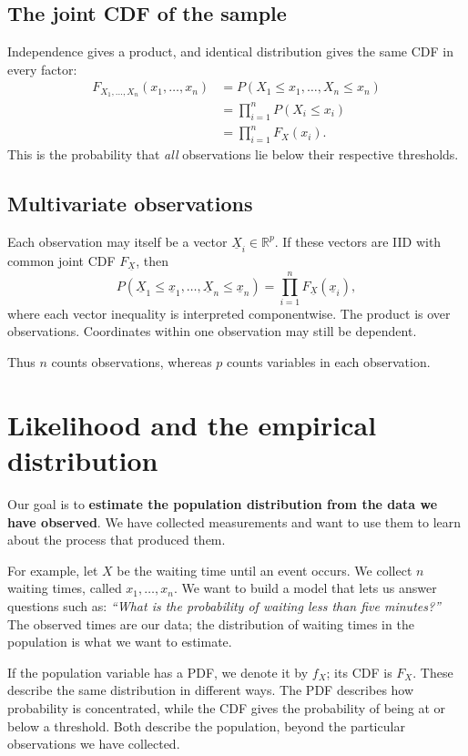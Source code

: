 \documentclass[a4paper,12pt,oneside]{report}
\begin{document}
\subsection{The joint CDF of the sample}
Independence gives a product, and identical distribution gives
the same CDF in every factor:
\begin{align*}
  F_{X_1,\ldots,X_n}(x_1,\ldots,x_n)
    &=P(X_1\leq x_1,\ldots,X_n\leq x_n)\\
    &=\prod_{i=1}^n P(X_i\leq x_i)\\
    &=\prod_{i=1}^n F_X(x_i).
\end{align*}
This is the probability that \emph{all} observations lie below
their respective thresholds.

\subsection{Multivariate observations}
Each observation may itself be a vector
$\underline{X}_i\in\mathbb R^p$. If these vectors are IID with common
joint CDF $F_{\underline{X}}$, then
\[
  P(\underline{X}_1\leq\underline{x}_1,\ldots,
     \underline{X}_n\leq\underline{x}_n)
    =\prod_{i=1}^n F_{\underline{X}}(\underline{x}_i),
\]
where each vector inequality is interpreted componentwise.
The product is over observations. Coordinates within one
observation may still be dependent.

Thus $n$ counts observations, whereas $p$ counts variables in
each observation.

\clearpage
\section{Likelihood and the empirical distribution}
\label{sec:likelihood-empirical}

Our goal is to \textbf{estimate the population distribution from
the data we have observed}. We have collected measurements and
want to use them to learn about the process that produced them.

For example, let $X$ be the waiting time until an event occurs.
We collect $n$ waiting times, called $x_1,\ldots,x_n$. We want
to build a model that lets us answer questions such as:
\emph{``What is the probability of waiting less than five minutes?''}
The observed times are our data; the distribution of waiting times
in the population is what we want to estimate.

If the population variable has a PDF, we denote it by $f_X$;
its CDF is $F_X$. These describe the same distribution in different
ways. The PDF describes how probability is concentrated, while
the CDF gives the probability of being at or below a threshold.
Both describe the population, beyond the particular observations
we have collected.
\end{document}

